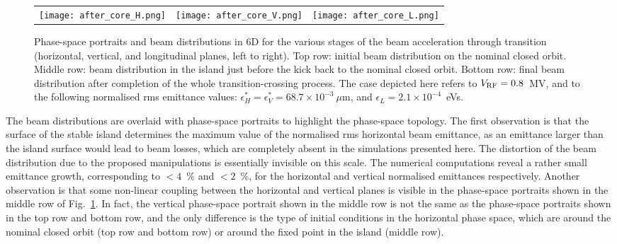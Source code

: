 \documentclass{article}
\begin{document}
\begin{figure}[p]
\begin{tabular}{ccc}
  \hspace{8truemm} \texttt{[image: after\_core\_H.png]} &
  \hspace{4truemm} \texttt{[image: after\_core\_V.png]} &
  \hspace{0truemm} \texttt{[image: after\_core\_L.png]} \\
    \end{tabular}
  \caption{Phase-space portraits and beam distributions in 6D for the various stages of the beam acceleration through transition (horizontal, vertical, and longitudinal planes, left to right). Top row: initial beam distribution on the nominal closed orbit. Middle row: beam distribution in the island just before the kick back to the nominal closed orbit. Bottom row: final beam distribution after completion of the whole transition-crossing process. The case depicted here refers to $V_{\rm RF}=0.8$~MV, and to the following normalised rms emittance values: $\epsilon^*_{H}=\epsilon^*_{V}=68.7 \times 10^{-3}~\mu$m, and $\epsilon_{L}=2.1 \times 10^{-4}$~eVs.}
\label{fig:simul1}
\end{figure}
%

The beam distributions are overlaid with phase-space portraits to highlight the phase-space topology. The first observation is that the surface of the stable island determines the maximum value of the normalised rms horizontal beam emittance, as an emittance larger than the island surface would lead to beam losses, which are completely absent in the simulations presented here. The distortion of the beam distribution due to the proposed manipulations is essentially invisible on this scale. The numerical computations reveal a rather small emittance growth, corresponding to $< 4$~\% and $< 2$~\%, for the horizontal and vertical normalised emittances respectively. Another observation is that some non-linear coupling between the horizontal and vertical planes is visible in the phase-space portraits shown in the middle row of Fig.~\ref{fig:simul1}. In fact, the vertical phase-space portrait shown in the middle row is not the same as the phase-space portraits shown in the top row and bottom row, and the only difference is the type of initial conditions in the horizontal phase space, which are around the nominal closed orbit (top row and bottom row) or around the fixed point in the island (middle row). 
\end{document}
